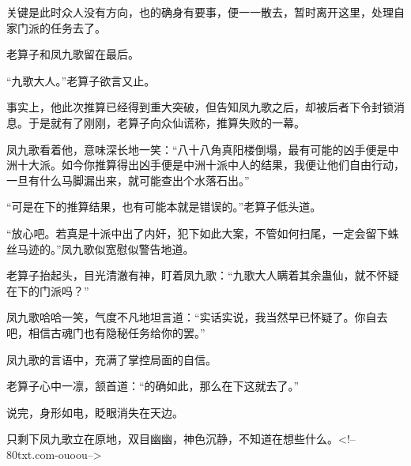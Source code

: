 \begin{this_body}
关键是此时众人没有方向，也的确身有要事，便一一散去，暂时离开这里，处理自家门派的任务去了。

老算子和凤九歌留在最后。

“九歌大人。”老算子欲言又止。

事实上，他此次推算已经得到重大突破，但告知凤九歌之后，却被后者下令封锁消息。于是就有了刚刚，老算子向众仙谎称，推算失败的一幕。

凤九歌看着他，意味深长地一笑：“八十八角真阳楼倒塌，最有可能的凶手便是中洲十大派。如今你推算得出凶手便是中洲十派中人的结果，我便让他们自由行动，一旦有什么马脚漏出来，就可能查出个水落石出。”

“可是在下的推算结果，也有可能本就是错误的。”老算子低头道。

“放心吧。若真是十派中出了内奸，犯下如此大案，不管如何扫尾，一定会留下蛛丝马迹的。”凤九歌似宽慰似警告地道。

老算子抬起头，目光清澈有神，盯着凤九歌：“九歌大人瞒着其余蛊仙，就不怀疑在下的门派吗？”

凤九歌哈哈一笑，气度不凡地坦言道：“实话实说，我当然早已怀疑了。你自去吧，相信古魂门也有隐秘任务给你的罢。”

凤九歌的言语中，充满了掌控局面的自信。

老算子心中一凛，颔首道：“的确如此，那么在下这就去了。”

说完，身形如电，眨眼消失在天边。

只剩下凤九歌立在原地，双目幽幽，神色沉静，不知道在想些什么。<!--80txt.com-ouoou-->

\end{this_body}

